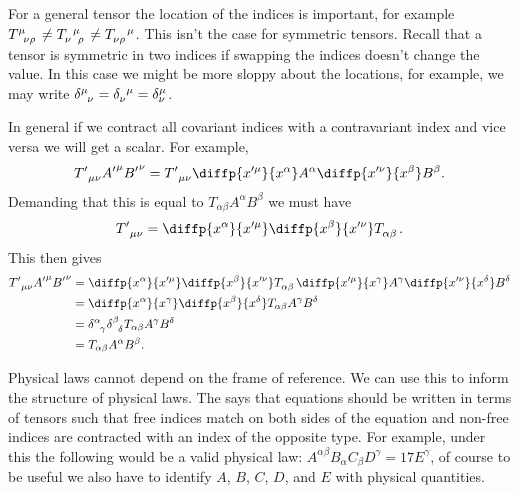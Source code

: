 \documentclass[fleqn]{NotesClass}
\begin{document}
    For a general tensor the location of the indices is important, for example \(\tensor{T}{^\mu_{\nu\rho}} \ne \tensor{T}{_\nu^\mu_\rho} \ne \tensor{T}{_{\nu\rho}^\mu}\).
    This isn't the case for symmetric tensors.
    Recall that a tensor is symmetric in two indices if swapping the indices doesn't change the value.
    In this case we might be more sloppy about the locations, for example, we may write \(\tensor{\delta}{^\mu_\nu} = \tensor{\delta}{_\nu^\mu} = \delta^\mu_\nu\).
    
    In general if we contract all covariant indices with a contravariant index and vice versa we will get a scalar.
    For example,
    \begin{align}
        \tensor{{T'}}{_{\mu\nu}}{A'}^{\mu}{B'}^{\nu} = \tensor{{T'}}{_{\mu\nu}} \diffp{x'^\mu}{x^\alpha} A^\alpha \diffp{x'^\nu}{x^\beta}B^\beta.
    \end{align}
    Demanding that this is equal to \(T_{\alpha\beta}A^\alpha B^\beta\) we must have
    \begin{equation}
        \tensor{{T'}}{_{\mu\nu}} = \diffp{x^\alpha}{x'^\mu} \diffp{x^\beta}{x'^\nu} \tensor{T}{_{\alpha\beta}}.
    \end{equation}
    This then gives
    \begin{align}
        \tensor{{T'}}{_{\mu\nu}}{A'}^{\mu}{B'}^{\nu} &= \diffp{x^\alpha}{x'^\mu} \diffp{x^\beta}{x'^\nu} \tensor{T}{_{\alpha\beta}} \diffp{x'^\mu}{x^\gamma} A^\gamma \diffp{x'^\nu}{x^\delta} B^\delta\\
        &= \diffp{x^\alpha}{x^\gamma} \diffp{x^\beta}{x^\delta} T_{\alpha\beta} A^\gamma B^\delta\\
        &= \tensor{\delta}{^\alpha_\gamma} \tensor{\delta}{^\beta_\delta} T_{\alpha\beta} A^\gamma B^\delta\\
        &= T_{\alpha\beta} A^\alpha B^\beta.
    \end{align}
    
    Physical laws cannot depend on the frame of reference.
    We can use this to inform the structure of physical laws.
    The  says that equations should be written in terms of tensors such that free indices match on both sides of the equation and non-free indices are contracted with an index of the opposite type.
    For example, under this the following would be a valid physical law: \(A^{\alpha\beta}B_\alpha C_\beta D^\gamma = 17 E^\gamma\), of course to be useful we also have to identify \(A\), \(B\), \(C\), \(D\), and \(E\) with physical quantities.
    
\end{document}
